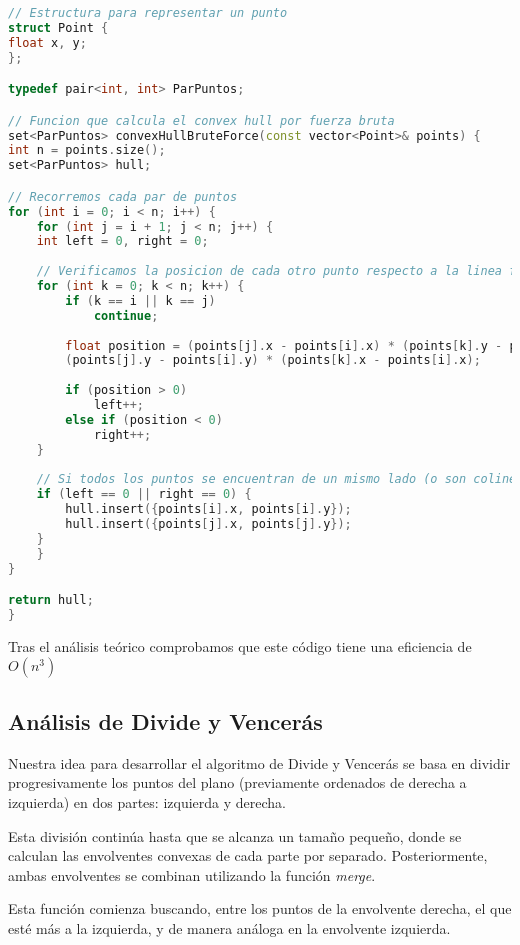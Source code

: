 \documentclass[a4paper,12pt]{article}
\begin{document}
\begin{lstlisting}[language=C++, caption={Brute Force de \textbf{``La envolvente convexa''}}]
// Estructura para representar un punto
struct Point {
float x, y;
};

typedef pair<int, int> ParPuntos;

// Funcion que calcula el convex hull por fuerza bruta
set<ParPuntos> convexHullBruteForce(const vector<Point>& points) {
int n = points.size();
set<ParPuntos> hull;

// Recorremos cada par de puntos
for (int i = 0; i < n; i++) {
	for (int j = i + 1; j < n; j++) {
	int left = 0, right = 0;
	
	// Verificamos la posicion de cada otro punto respecto a la linea formada por points[i] y points[j]
	for (int k = 0; k < n; k++) {
		if (k == i || k == j)
			continue;
			
		float position = (points[j].x - points[i].x) * (points[k].y - points[i].y) -
		(points[j].y - points[i].y) * (points[k].x - points[i].x);
		
		if (position > 0)
			left++;
		else if (position < 0)
			right++;
	}
	
	// Si todos los puntos se encuentran de un mismo lado (o son colineales), se adjuntan los puntos de la arista
	if (left == 0 || right == 0) {
		hull.insert({points[i].x, points[i].y});
		hull.insert({points[j].x, points[j].y});
	}
	}
}

return hull;
}
\end{lstlisting}

Tras el análisis teórico comprobamos que este código tiene una eficiencia de $O(n^3)$

\subsection{Análisis de Divide y Vencerás}
Nuestra idea para desarrollar el algoritmo de Divide y Vencerás se basa en dividir progresivamente los puntos del plano 
(previamente ordenados de derecha a izquierda) en dos partes: izquierda y derecha. 

Esta división continúa hasta que se alcanza un tamaño pequeño, donde se calculan las envolventes convexas de cada parte por separado. 
Posteriormente, ambas envolventes se combinan utilizando la función \textit{merge}. 

Esta función comienza buscando, entre los puntos de la envolvente derecha, el que esté más a la izquierda, 
y de manera análoga en la envolvente izquierda. 
\end{document}
